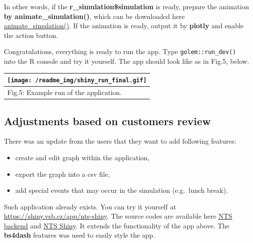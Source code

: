 \documentclass[
]{article}
\providecommand{\tightlist}{%
  \setlength{\itemsep}{0pt}\setlength{\parskip}{0pt}}
\begin{document}
In other words, if the \textbf{r\_simulation\$simulation} is ready,
prepare the animation \textbf{by animate\_simulation()}, which can be
downloaded here
\href{https://github.com/It4innovations/NTS/blob/main/R/animate_simulation.R}{animate\_simulation()}.
If the animation is ready, output it by \textbf{plotly} and enable the
action button.

Congratulations, everything is ready to run the app. Type
\texttt{golem::run\_dev()} into the R console and try it yourself. The
app should look like as in Fig.5, below.

\begin{longtable}[]{@{}l@{}}
\toprule()
\texttt{[image: /readme\_img/shiny\_run\_final.gif]} \\
\midrule()
\endhead
Fig.5: Example run of the application. \\
\bottomrule()
\end{longtable}

\hypertarget{adjustments-based-on-customers-review}{%
\subsection{Adjustments based on customers
review}\label{adjustments-based-on-customers-review}}

There was an update from the users that they want to add following
features:

\begin{itemize}
\tightlist
\item
  create and edit graph within the application,
\item
  export the graph into a csv file,
\item
  add special events that may occur in the simulation (e.g.~lunch
  break).
\end{itemize}

Such application already exists. You can try it yourself at
\url{https://shiny.vsb.cz/app/nts-shiny}. The source codes are available
here \href{https://github.com/It4innovations/NTS/}{NTS backend} and
\href{https://github.com/It4innovations/NTS_shiny/}{NTS Shiny}. It
extends the functionality of the app above. The \textbf{bs4dash}
features was used to easily style the app.

\newpage
\end{document}
